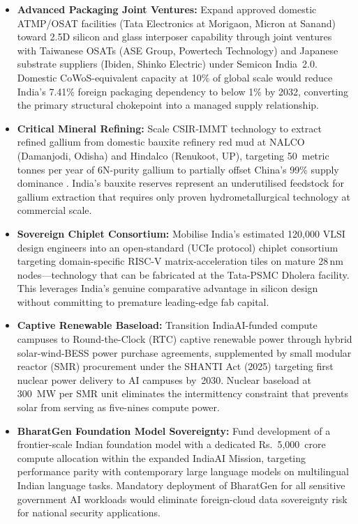 \documentclass[conference]{IEEEtran}
\begin{document}
\begin{itemize}[leftmargin=*, noitemsep, topsep=2pt]
  \item \textbf{Advanced Packaging Joint Ventures:} Expand approved domestic ATMP/OSAT facilities (Tata Electronics at Morigaon, Micron at Sanand) toward 2.5D silicon and glass interposer capability through joint ventures with Taiwanese OSATs (ASE Group, Powertech Technology) and Japanese substrate suppliers (Ibiden, Shinko Electric) under Semicon India~2.0. Domestic CoWoS-equivalent capacity at 10\% of global scale would reduce India's 7.41\% foreign packaging dependency to below 1\% by 2032, converting the primary structural chokepoint into a managed supply relationship.
  \item \textbf{Critical Mineral Refining:} Scale CSIR-IMMT technology to extract refined gallium from domestic bauxite refinery red mud at NALCO (Damanjodi, Odisha) and Hindalco (Renukoot, UP), targeting 50~metric tonnes per year of 6N-purity gallium to partially offset China's 99\% supply dominance \cite{usgs2025gallium}. India's bauxite reserves represent an underutilised feedstock for gallium extraction that requires only proven hydrometallurgical technology at commercial scale.
  \item \textbf{Sovereign Chiplet Consortium:} Mobilise India's estimated 120{,}000 VLSI design engineers into an open-standard (UCIe protocol) chiplet consortium targeting domain-specific RISC-V matrix-acceleration tiles on mature 28\,nm nodes---technology that can be fabricated at the Tata-PSMC Dholera facility. This leverages India's genuine comparative advantage in silicon design without committing to premature leading-edge fab capital.
  \item \textbf{Captive Renewable Baseload:} Transition IndiaAI-funded compute campuses to Round-the-Clock (RTC) captive renewable power through hybrid solar-wind-BESS power purchase agreements, supplemented by small modular reactor (SMR) procurement under the SHANTI Act (2025) targeting first nuclear power delivery to AI campuses by~2030. Nuclear baseload at 300~MW per SMR unit eliminates the intermittency constraint that prevents solar from serving as five-nines compute power.
  \item \textbf{BharatGen Foundation Model Sovereignty:} Fund development of a frontier-scale Indian foundation model with a dedicated Rs.~5{,}000~crore compute allocation within the expanded IndiaAI Mission, targeting performance parity with contemporary large language models on multilingual Indian language tasks. Mandatory deployment of BharatGen for all sensitive government AI workloads would eliminate foreign-cloud data sovereignty risk for national security applications.
\end{itemize}
\end{document}
